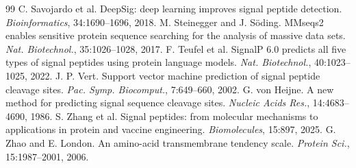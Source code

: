\documentclass[unnumsec,webpdf,contemporary,large]{oup-authoring-template}
\begin{document}
\begin{thebibliography}{99}
 C. Savojardo et al. DeepSig: deep learning improves signal peptide detection. \textit{Bioinformatics}, 34:1690--1696, 2018.
 M. Steinegger and J. S\"oding. MMseqs2 enables sensitive protein sequence searching for the analysis of massive data sets. \textit{Nat. Biotechnol.}, 35:1026--1028, 2017.
 F. Teufel et al. SignalP 6.0 predicts all five types of signal peptides using protein language models. \textit{Nat. Biotechnol.}, 40:1023--1025, 2022.
 J. P. Vert. Support vector machine prediction of signal peptide cleavage sites. \textit{Pac. Symp. Biocomput.}, 7:649--660, 2002.
 G. von Heijne. A new method for predicting signal sequence cleavage sites. \textit{Nucleic Acids Res.}, 14:4683--4690, 1986.
 S. Zhang et al. Signal peptides: from molecular mechanisms to applications in protein and vaccine engineering. \textit{Biomolecules}, 15:897, 2025.
 G. Zhao and E. London. An amino-acid transmembrane tendency scale. \textit{Protein Sci.}, 15:1987--2001, 2006.

\end{thebibliography}
\end{document}
